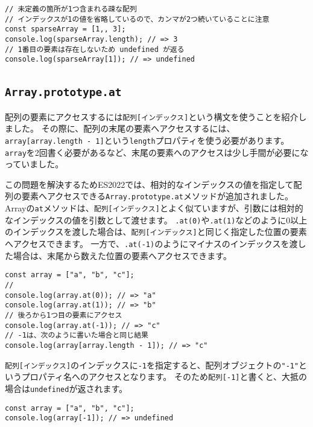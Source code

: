 \begin{lstlisting}
// 未定義の箇所が1つ含まれる疎な配列
// インデックスが1の値を省略しているので、カンマが2つ続いていることに注意
const sparseArray = [1,, 3];
console.log(sparseArray.length); // => 3
// 1番目の要素は存在しないため undefined が返る
console.log(sparseArray[1]); // => undefined
\end{lstlisting}

\hypertarget{array-at}{%
\subsection[Array.prototype.at]{\texttt{Array.prototype.at}\,\protect{}}\label{array-at}}

配列の要素にアクセスするには\texttt{配列[インデックス]}という構文を使うことを紹介しました。
その際に、配列の末尾の要素へアクセスするには、\texttt{array[array.length - 1]}という\texttt{length}プロパティを使う必要があります。
\texttt{array}を2回書く必要があるなど、末尾の要素へのアクセスは少し手間が必要になっていました。

この問題を解決するためES2022では、相対的なインデックスの値を指定して配列の要素へアクセスできる\texttt{Array.prototype.at}メソッドが追加されました。
Arrayの\texttt{at}メソッドは、\texttt{配列[インデックス]}とよく似ていますが、引数には相対的なインデックスの値を引数として渡せます。
\texttt{.at(0)}や\texttt{.at(1)}などのように0以上のインデックスを渡した場合は、\texttt{配列[インデックス]}と同じく指定した位置の要素へアクセスできます。
一方で、\texttt{.at(-1)}のようにマイナスのインデックスを渡した場合は、末尾から数えた位置の要素へアクセスできます。
\begin{lstlisting}
const array = ["a", "b", "c"];
//
console.log(array.at(0)); // => "a"
console.log(array.at(1)); // => "b"
// 後ろから1つ目の要素にアクセス
console.log(array.at(-1)); // => "c"
// -1は、次のように書いた場合と同じ結果
console.log(array[array.length - 1]); // => "c"
\end{lstlisting}

\texttt{配列[インデックス]}のインデックスに\texttt{-1}を指定すると、配列オブジェクトの\texttt{"-1"}というプロパティ名へのアクセスとなります。
そのため\texttt{配列[-1]}と書くと、大抵の場合は\texttt{undefined}が返されます。

\begin{lstlisting}
const array = ["a", "b", "c"];
console.log(array[-1]); // => undefined
\end{lstlisting}

